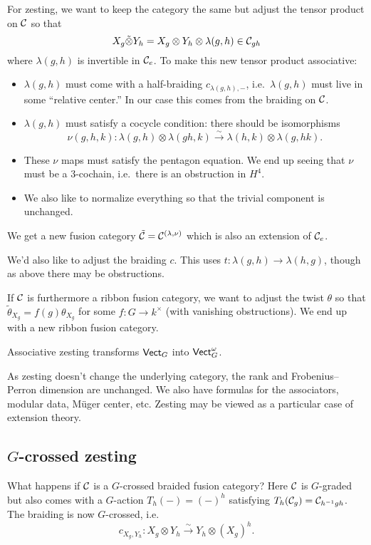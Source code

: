 \documentclass{amsart}
\begin{document}
For zesting, we want to keep the category the same but adjust the tensor product on $\mathcal{C}$ so that
\[
  X_g \tilde{\otimes} Y_h = X_g \otimes Y_h \otimes \lambda(g, h) \in \mathcal{C}_{gh}
\]
where $\lambda(g, h)$ is invertible in $\mathcal{C}_e$.
To make this new tensor product associative:
\begin{itemize}
  \item $\lambda(g, h)$ must come with a half-braiding $c_{\lambda(g,h),-}$, i.e.\ $\lambda(g,h)$ must live in some ``relative center.''
    In our case this comes from the braiding on $\mathcal{C}$.
  \item $\lambda(g, h)$ must satisfy a cocycle condition: there should be isomorphisms 
    \[
      \nu(g, h, k): \lambda(g, h) \otimes \lambda(gh, k) \xrightarrow{\sim} \lambda(h, k) \otimes \lambda(g, hk).
    \]
  \item These $\nu$ maps must satisfy the pentagon equation.
    We end up seeing that $\nu$ must be a $3$-cochain, i.e.\ there is an obstruction in $H^4$.
  \item We also like to normalize everything so that the trivial component is unchanged.
\end{itemize}
We get a new fusion category $\tilde{\mathcal{C}} = \mathcal{C}^{(\lambda,\nu)}$ which is also an extension of $\mathcal{C}_e$.

We'd also like to adjust the braiding $c$.
This uses $t: \lambda(g, h) \to \lambda(h, g)$, though as above there may be obstructions.

If $\mathcal{C}$ is furthermore a ribbon fusion category, we want to adjust the twist $\theta$ so that $\tilde{\theta}_{X_g} = f(g) \theta_{X_g}$ for some $f: G \to k^\times$ (with vanishing obstructions).
We end up with a new ribbon fusion category.

\begin{ex}
  Associative zesting transforms $\mathsf{Vect}_G$ into $\mathsf{Vect}_G^\omega$.
\end{ex}

As zesting doesn't change the underlying category, the rank and Frobenius--Perron dimension are unchanged.
We also have formulas for the associators, modular data, M\"uger center, etc.
Zesting may be viewed as a particular case of extension theory.

\subsection{$G$-crossed zesting}

What happens if $\mathcal{C}$ is a $G$-crossed braided fusion category?
Here $\mathcal{C}$ is $G$-graded but also comes with a $G$-action $T_h(-) = (-)^h$ satisfying $T_h(\mathcal{C}_g) = \mathcal{C}_{h^{-1} g h}$.
The braiding is now $G$-crossed, i.e.\
\[
  c_{X_g,Y_h}: X_g \otimes Y_h \xrightarrow{\sim} Y_h \otimes (X_g)^h.
\]
\end{document}
